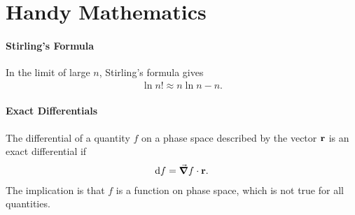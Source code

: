 \section{Handy Mathematics}

\paragraph{Stirling's Formula}
In the limit of large $n$, Stirling's formula gives
\begin{align*}
	\ln{n!}\approx n\ln{n} - n.
\end{align*}

\paragraph{Exact Differentials}
The differential of a quantity $f$ on a phase space described by the vector $\vb{r}$ is an exact differential if
\begin{align*}
	\dd{f} = \grad{f}\cdot\vb{r}.
\end{align*}
The implication is that $f$ is a function on phase space, which is not true for all quantities.